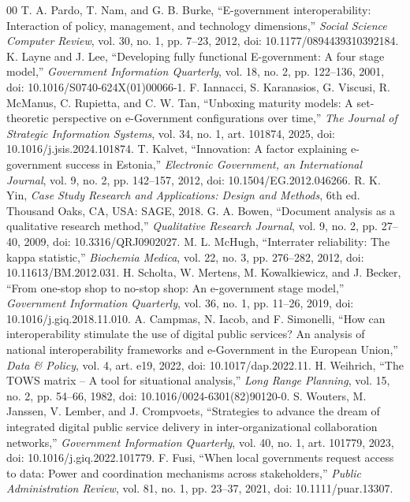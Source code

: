\documentclass[conference]{IEEEtran}
\begin{document}
\begin{thebibliography}{00}
 T. A. Pardo, T. Nam, and G. B. Burke, ``E-government interoperability: Interaction of policy, management, and technology dimensions,'' \emph{Social Science Computer Review}, vol. 30, no. 1, pp. 7--23, 2012, doi: 10.1177/0894439310392184.
 K. Layne and J. Lee, ``Developing fully functional E-government: A four stage model,'' \emph{Government Information Quarterly}, vol. 18, no. 2, pp. 122--136, 2001, doi: 10.1016/S0740-624X(01)00066-1.
 F. Iannacci, S. Karanasios, G. Viscusi, R. McManus, C. Rupietta, and C. W. Tan, ``Unboxing maturity models: A set-theoretic perspective on e-Government configurations over time,'' \emph{The Journal of Strategic Information Systems}, vol. 34, no. 1, art. 101874, 2025, doi: 10.1016/j.jsis.2024.101874.
 T. Kalvet, ``Innovation: A factor explaining e-government success in Estonia,'' \emph{Electronic Government, an International Journal}, vol. 9, no. 2, pp. 142--157, 2012, doi: 10.1504/EG.2012.046266.
 R. K. Yin, \emph{Case Study Research and Applications: Design and Methods}, 6th ed. Thousand Oaks, CA, USA: SAGE, 2018.
 G. A. Bowen, ``Document analysis as a qualitative research method,'' \emph{Qualitative Research Journal}, vol. 9, no. 2, pp. 27--40, 2009, doi: 10.3316/QRJ0902027.
 M. L. McHugh, ``Interrater reliability: The kappa statistic,'' \emph{Biochemia Medica}, vol. 22, no. 3, pp. 276--282, 2012, doi: 10.11613/BM.2012.031.
 H. Scholta, W. Mertens, M. Kowalkiewicz, and J. Becker, ``From one-stop shop to no-stop shop: An e-government stage model,'' \emph{Government Information Quarterly}, vol. 36, no. 1, pp. 11--26, 2019, doi: 10.1016/j.giq.2018.11.010.
 A. Campmas, N. Iacob, and F. Simonelli, ``How can interoperability stimulate the use of digital public services? An analysis of national interoperability frameworks and e-Government in the European Union,'' \emph{Data \& Policy}, vol. 4, art. e19, 2022, doi: 10.1017/dap.2022.11.
 H. Weihrich, ``The TOWS matrix -- A tool for situational analysis,'' \emph{Long Range Planning}, vol. 15, no. 2, pp. 54--66, 1982, doi: 10.1016/0024-6301(82)90120-0.
 S. Wouters, M. Janssen, V. Lember, and J. Crompvoets, ``Strategies to advance the dream of integrated digital public service delivery in inter-organizational collaboration networks,'' \emph{Government Information Quarterly}, vol. 40, no. 1, art. 101779, 2023, doi: 10.1016/j.giq.2022.101779.
 F. Fusi, ``When local governments request access to data: Power and coordination mechanisms across stakeholders,'' \emph{Public Administration Review}, vol. 81, no. 1, pp. 23--37, 2021, doi: 10.1111/puar.13307.

\end{thebibliography}
\end{document}
